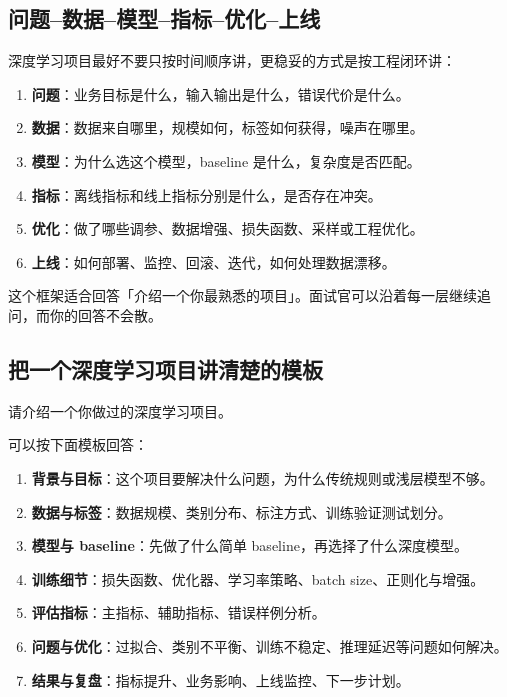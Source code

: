 \subsection{问题--数据--模型--指标--优化--上线}
深度学习项目最好不要只按时间顺序讲，更稳妥的方式是按工程闭环讲：
\begin{enumerate}[leftmargin=2em]
  \item \textbf{问题}：业务目标是什么，输入输出是什么，错误代价是什么。
  \item \textbf{数据}：数据来自哪里，规模如何，标签如何获得，噪声在哪里。
  \item \textbf{模型}：为什么选这个模型，baseline 是什么，复杂度是否匹配。
  \item \textbf{指标}：离线指标和线上指标分别是什么，是否存在冲突。
  \item \textbf{优化}：做了哪些调参、数据增强、损失函数、采样或工程优化。
  \item \textbf{上线}：如何部署、监控、回滚、迭代，如何处理数据漂移。
\end{enumerate}
这个框架适合回答「介绍一个你最熟悉的项目」。面试官可以沿着每一层继续追问，而你的回答不会散。
\subsection{把一个深度学习项目讲清楚的模板}
\begin{interview}
请介绍一个你做过的深度学习项目。
\end{interview}
\begin{answer}
可以按下面模板回答：
\begin{enumerate}[leftmargin=2em]
  \item \textbf{背景与目标}：这个项目要解决什么问题，为什么传统规则或浅层模型不够。
  \item \textbf{数据与标签}：数据规模、类别分布、标注方式、训练验证测试划分。
  \item \textbf{模型与 baseline}：先做了什么简单 baseline，再选择了什么深度模型。
  \item \textbf{训练细节}：损失函数、优化器、学习率策略、batch size、正则化与增强。
  \item \textbf{评估指标}：主指标、辅助指标、错误样例分析。
  \item \textbf{问题与优化}：过拟合、类别不平衡、训练不稳定、推理延迟等问题如何解决。
  \item \textbf{结果与复盘}：指标提升、业务影响、上线监控、下一步计划。
\end{enumerate}
\end{answer}
